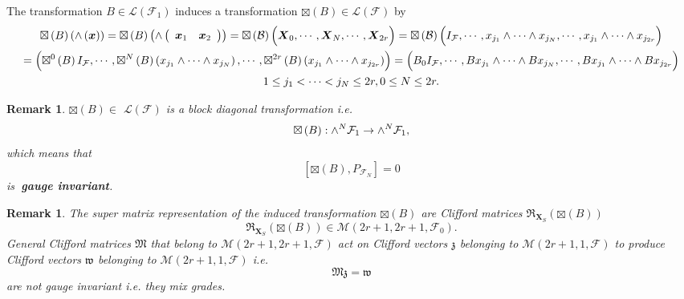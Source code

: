 \documentclass[aps,preprint]{revtex4}
\newtheorem{remark}[theorem]{Remark}
\begin{document}
The transformation $B\in \mathcal{L}\left( \mathcal{F}_{1}\right) $ induces
a transformation $\boxtimes \left( B\right) \in \mathcal{L}\left( \mathcal{F}%
\right) $ by 
\begin{gather}
\boxtimes \left( B\right) \left( {\Huge \wedge }\left( \overset{}{%
\boldsymbol{x}}\right) \right) =\boxtimes \left( B\right) \left( {\Huge %
\wedge }\left( 
\begin{array}{cc}
\boldsymbol{x}_{1} & \boldsymbol{x}_{2}%
\end{array}%
\right) \right) =\boxtimes \left( \mathcal{B}\right) \left( \overset{}{%
\boldsymbol{X}_{0},\cdots ,\boldsymbol{X}_{N},\cdots ,\boldsymbol{X}_{2r}}%
\right) =\boxtimes \left( \mathcal{B}\right) \left( \overset{}{I_{\mathcal{F}%
},\cdots ,x_{j_{1}}\wedge \cdots \wedge x_{j_{N}},\cdots ,x_{j_{1}}\wedge
\cdots \wedge x_{j_{2r}}}\right) \\
=\left( \overset{}{\boxtimes ^{0}\left( B\right) I_{\mathcal{F}},\cdots
,\boxtimes ^{N}\left( B\right) \left( x_{j_{1}}\wedge \cdots \wedge
x_{j_{N}}\right) ,\cdots ,\boxtimes ^{2r}\left( B\right) \left(
x_{j_{1}}\wedge \cdots \wedge x_{j_{2r}}\right) }\right) =\left( \overset{}{%
B_{0}I_{\mathcal{F}},\cdots ,Bx_{j_{1}}\wedge \cdots \wedge
Bx_{j_{N}},\cdots ,Bx_{j_{1}}\wedge \cdots \wedge Bx_{j_{2r}}}\right) \\
1\leq j_{1}<\cdots <j_{N}\leq 2r,0\leq N\leq 2r.
\end{gather}

\begin{remark}
$\boxtimes \left( B\right) \in $ $\mathcal{L}\left( \mathcal{F}\right) $ is
a block diagonal transformation i.e. 
\begin{equation}
\boxtimes \left( B\right) :{\Huge \wedge }^{N}\mathcal{F}_{1}\rightarrow 
{\Huge \wedge }^{N}\mathcal{F}_{1},
\end{equation}%
which means that%
\begin{equation}
\left[ \boxtimes \left( B\right) ,P_{\mathcal{F}_{N}}\right] =0
\end{equation}%
is\textbf{\ gauge invariant}.
\end{remark}

\begin{remark}
The super matrix representation of the induced transformation $\boxtimes
\left( B\right) $ are Clifford matrices $\mathfrak{R}_{\boldsymbol{X}%
_{S}}\left( \boxtimes \left( B\right) \right) $ 
\begin{equation}
\mathfrak{R}_{\boldsymbol{X}_{S}}\left( \boxtimes \left( B\right) \right)
\in \mathcal{M}\left( 2r+1,2r+1,\mathcal{F}_{0}\right) .
\end{equation}%
General Clifford matrices $\mathfrak{M}$ that belong to $\mathcal{M}\left(
2r+1,2r+1,\mathcal{F}\right) $ act on Clifford vectors $\mathfrak{z}$
belonging to $\mathcal{M}\left( 2r+1,1,\mathcal{F}\right) $ to produce
Clifford vectors $\mathfrak{w}$ belonging to $\mathcal{M}\left( 2r+1,1,%
\mathcal{F}\right) $ i.e. 
\begin{equation}
\mathfrak{Mz=w}
\end{equation}%
are not gauge invariant i.e. they mix grades.
\end{remark}
\end{document}
